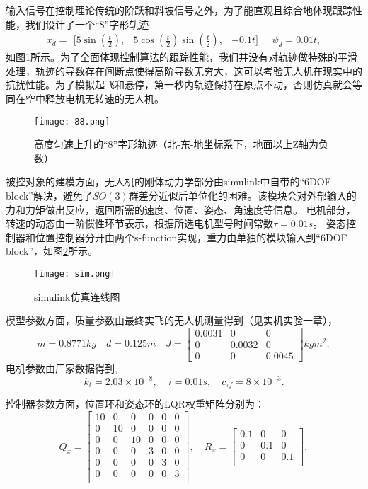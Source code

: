 输入信号在控制理论传统的阶跃和斜坡信号之外，为了能直观且综合地体现跟踪性能，我们设计了一个“8”字形轨迹
$$x_d = \begin{matrix}[5\sin(\frac{t}{2}), & 5\cos(\frac{t}{2})\sin(\frac{t}{2}), &-0.1t]\end{matrix}
\quad
\psi_d=0.01t,$$
如图\ref{fig:8}所示。为了全面体现控制算法的跟踪性能，我们并没有对轨迹做特殊的平滑处理，轨迹的导数存在间断点使得高阶导数无穷大，这可以考验无人机在现实中的抗扰性能。为了模拟起飞和悬停，第一秒内轨迹保持在原点不动，否则仿真就会等同在空中释放电机无转速的无人机。
\begin{figure}[!h]
  \centering
  \texttt{[image: 88.png]}
  \caption{高度匀速上升的“8”字形轨迹（北-东-地坐标系下，地面以上Z轴为负数）}
  \label{fig:8}
\end{figure}

被控对象的建模方面，无人机的刚体动力学部分由simulink中自带的“6DOF block”解决，避免了$SO(3)$群差分近似后单位化的困难。该模块会对外部输入的力和力矩做出反应，返回所需的速度、位置、姿态、角速度等信息。
电机部分，转速的动态由一阶惯性环节表示，根据所选电机型号时间常数$\tau=0.01s$。
姿态控制器和位置控制器分开由两个s-function实现，重力由单独的模块输入到“6DOF block”，如图\ref{fig:sim}所示。
\begin{figure}[!h]
    \centering
    \texttt{[image: sim.png]}
    \caption{simulink仿真连线图}
    \label{fig:sim}
  \end{figure}

模型参数方面，质量参数由最终实飞的无人机测量得到（见实机实验一章），
$$m=0.8771kg \quad d=0.125m \quad J=\begin{bmatrix}
  0.0031   &      0  &       0\\
  0 &   0.0032      &   0\\
  0  &       0   & 0.0045
\end{bmatrix}kg m^2,$$
电机参数由厂家数据得到,
$$k_t=2.03\times 10^{-8} ,\quad 
\tau=0.01s, \quad
c_{\tau f}=8\times 10^{-3}.$$

控制器参数方面，位置环和姿态环的LQR权重矩阵分别为：
$$Q_x=\begin{bmatrix}
  10&0&0&0&0&0\\
  0&10&0&0&0&0\\
  0&0&10&0&0&0\\
  0&0&0&3&0&0\\
  0&0&0&0&3&0\\
  0&0&0&0&0&3\\
\end{bmatrix}, \quad R_x=\begin{bmatrix}
  0.1 &0 &0\\
  0 &0.1 &0\\
  0 &0 &0.1\\
\end{bmatrix},$$

